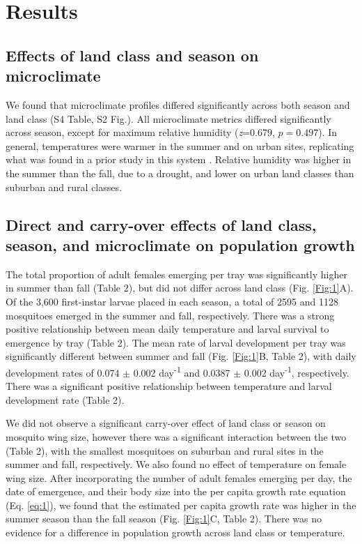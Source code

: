 \documentclass{bmcart}
\begin{document}
\section*{Results}

\subsection*{Effects of land class and season on microclimate}

We found that microclimate profiles differed significantly across both season and land class (S4 Table, S2 Fig.). All microclimate metrics differed significantly across season, except for maximum relative humidity (\textit{z}=0.679, $p=0.497$). In general, temperatures were warmer in the summer and on urban sites, replicating what was found in a prior study in this system \citep{murdock2017}. Relative humidity was higher in the summer than the fall, due to a drought, and lower on urban land classes than suburban and rural classes.

\subsection*{Direct and carry-over effects of land class, season, and microclimate on population growth}

The total proportion of adult females emerging per tray was significantly higher in summer than fall (Table 2), but did not differ across land class (Fig. \ref{Fig:1}A). Of the 3,600 first-instar larvae placed in each season, a total of 2595 and 1128 mosquitoes emerged in the summer and fall, respectively. There was a strong positive relationship between mean daily temperature and larval survival to emergence by tray (Table 2). The mean rate of larval development per tray was significantly different between summer and fall (Fig. \ref{Fig:1}B, Table 2), with daily development rates of 0.074 $\pm$ 0.002 day\textsuperscript{-1} and 0.0387 $\pm$ 0.002 day\textsuperscript{-1}, respectively. There was a significant positive relationship between temperature and larval development rate (Table 2).

We did not observe a significant carry-over effect of land class or season on mosquito wing size, however there was a significant interaction between the two (Table 2), with the smallest mosquitoes on suburban and rural sites in the summer and fall, respectively. We also found no effect of temperature on female wing size. After incorporating the number of adult females emerging per day, the date of emergence, and their body size into the per capita growth rate equation (Eq. \ref{eq:1}), we found that the estimated per capita growth rate was higher in the summer season than the fall season (Fig. \ref{Fig:1}C, Table 2). There was no evidence for a difference in population growth across land class or temperature.
\end{document}
